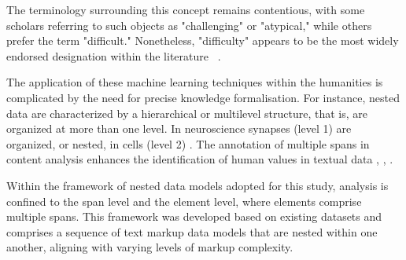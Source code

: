 \documentclass{article}
\begin{document}
The terminology surrounding this concept remains contentious, with some scholars referring to such objects as "challenging" or "atypical," while others prefer the term "difficult." Nonetheless, "difficulty" appears to be the most widely endorsed designation within the literature ~\cite{agarwal2022estimating}. 

The application of these machine learning techniques within the humanities is complicated by the need for precise knowledge formalisation. For instance, nested data are characterized by a hierarchical or multilevel structure, that is, are organized at more than one level. In neuroscience synapses (level 1) are organized, or nested, in cells (level 2) \cite{aarts2014solution}. The annotation of multiple spans in content analysis enhances the identification of human values in textual data \cite{10893762}, \cite{rink2024detecting}, \cite{vorontsov2025detecting}.

Within the framework of nested data models adopted for this study, analysis is confined to the span level and the element level, where elements comprise multiple spans. This framework was developed based on existing datasets and comprises a sequence of text markup data models that are nested within one another, aligning with varying levels of markup complexity. 
\end{document}
